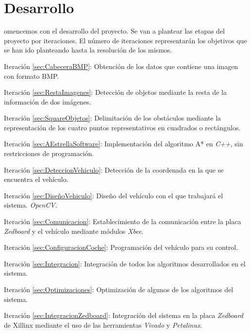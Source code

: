 \chapter{Desarrollo}\label{chap:desarrollo}

omencemos con el desarrollo del proyecto. Se van a plantear las etapas del proyecto por iteraciones. El número de iteraciones representarán los objetivos que se han ido planteando hasta la resolución de los mismos.

\begin{definitionlist}
\item[Iteración \ref{sec:CabeceraBMP}: \nameref{sec:CabeceraBMP}] Obtención de los datos que contiene una imagen con formato \acs{BMP}.
\item[Iteración \ref{sec:RestaImagenes}: \nameref{sec:RestaImagenes}] Detección de objetos mediante la resta de la información de dos imágenes.
\item[Iteración \ref{sec:SquareObjetos}: \nameref{sec:SquareObjetos}] Delimitación de los obstáculos mediante la representación de los cuatro puntos representativos en cuadrados o rectángulos.
\item[Iteración \ref{sec:AEstrellaSoftware}: \nameref{sec:AEstrellaSoftware}] Implementación del algoritmo A* en \emph{C++}, sin restricciones de programación.
\item[Iteración \ref{sec:DeteccionVehiculo}: \nameref{sec:DeteccionVehiculo}] Detección de la coordenada en la que se encuentra el vehículo. 
\item[Iteración \ref{sec:DiseñoVehiculo}: \nameref{sec:DiseñoVehiculo}] Diseño del vehículo con el que trabajará el sistema. \emph{OpenCV}.
\item[Iteración \ref{sec:Comunicacion}: \nameref{sec:Comunicacion}] Establecimiento de la comunicación entre la placa \emph{Zedboard} y el vehículo mediante módulos \emph{Xbee}.
\item[Iteración \ref{sec:ConfiguracionCoche}: \nameref{sec:ConfiguracionCoche}] Programación del vehículo para su control.
\item[Iteración \ref{sec:Integracion}: \nameref{sec:Integracion}] Integración de todos los algoritmos desarrollados en el sistema.
\item[Iteración \ref{sec:Optimizaciones}: \nameref{sec:Optimizaciones}] Optimización de algunos de los algoritmos del sistema.
\item[Iteración \ref{sec:IntegracionZedboard}: \nameref{sec:IntegracionZedboard}] Integración del sistema en la placa \emph{Zedboard} de Xillinx mediante el uso de las herramientas \emph{Vivado} y \emph{Petalinux}.
\end{definitionlist}

